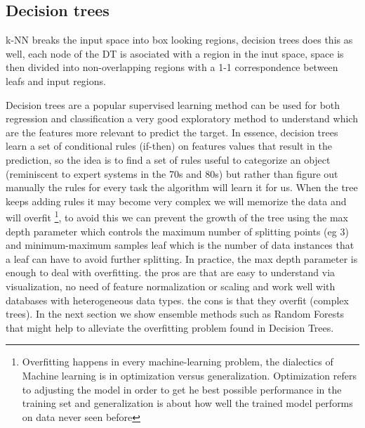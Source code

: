\documentclass[12pt]{report}
\begin{document}
\subsection{Decision trees}
k-NN breaks the input space into box looking regions, decision trees does this as well, each node of the DT is asociated with a region in the inut space, space is then divided into non-overlapping regions with a 1-1 correspondence between leafs and input regions.


Decision trees are a popular supervised learning method can be used for both regression and classification  a very good exploratory method to understand which are the features more relevant to predict the target.
In essence, decision trees learn a set of conditional rules (if-then) on features values that result in the prediction, so the idea is to find a set of rules useful to categorize an object (reminiscent to expert systems in the 70s and 80s) but rather than figure out manually the rules for every task the algorithm will learn it for us.
When the tree keeps adding rules it may become very complex we will memorize the data and will overfit \footnote{Overfitting happens in every machine-learning problem, the dialectics of Machine learning is in optimization versus generalization. Optimization refers to adjusting the model in order to get he best possible performance in the training set and generalization is about how well the trained model performs on data never seen before}, to avoid this we can prevent the growth of the tree using the max depth parameter which controls the maximum number of splitting points (eg 3) and minimum-maximum samples leaf which is the number of data instances that a leaf can have to avoid further splitting.  In practice, the max depth parameter is enough to deal with overfitting.
the pros are that are easy to understand via visualization, no need of feature normalization or scaling and work well with databases with heterogeneous data types. the cons is that they overfit (complex trees). In the next section we show ensemble methods such as Random Forests that might help to alleviate the overfitting problem found in Decision Trees.
\end{document}
